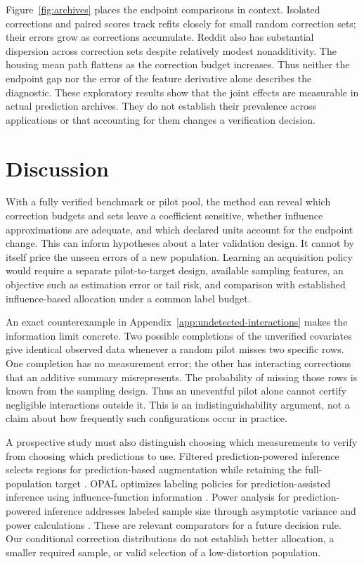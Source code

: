\documentclass[11pt]{article}
\begin{document}
Figure~\ref{fig:archives} places the endpoint comparisons in context. Isolated
corrections and paired scores track refits closely for small random correction
sets; their errors grow as corrections accumulate. Reddit also has substantial
dispersion across correction sets despite relatively modest nonadditivity.
The housing mean path flattens as the correction budget increases. Thus neither
the endpoint gap nor the error of the feature derivative alone describes the
diagnostic. These exploratory results show that the joint effects are measurable
in actual prediction archives. They do not establish their prevalence across
applications or that accounting for them changes a verification decision.

\section{Discussion}

With a fully verified benchmark or pilot pool, the method can reveal which
correction budgets and sets leave a coefficient sensitive, whether influence
approximations are adequate, and which declared units account for the endpoint
change. This can inform hypotheses about a later validation design. It cannot
by itself price the unseen errors of a new population. Learning an acquisition
policy would require a separate pilot-to-target design, available sampling
features, an objective such as estimation error or tail risk, and comparison
with established influence-based allocation under a common label budget.

An exact counterexample in Appendix~\ref{app:undetected-interactions} makes the
information limit concrete. Two possible completions of the unverified
covariates give identical observed data whenever a random pilot misses two
specific rows. One completion has no measurement error; the other has interacting
corrections that an additive summary misrepresents. The probability of missing
those rows is known from the sampling design. Thus an uneventful pilot alone
cannot certify negligible interactions outside it. This is an indistinguishability
argument, not a claim about how frequently such configurations occur in practice.

A prospective study must also distinguish choosing which measurements to
verify from choosing which predictions to use. Filtered prediction-powered
inference selects regions for prediction-based augmentation while retaining the
full-population target \citep{xu2026}. OPAL optimizes labeling policies for
prediction-assisted inference using influence-function information
\citep{ma2026}. Power analysis for prediction-powered inference addresses labeled
sample size through asymptotic variance and power calculations \citep{chen2026}.
These are relevant comparators for a future decision rule. Our conditional
correction distributions do not establish better allocation, a smaller required
sample, or valid selection of a low-distortion population.
\end{document}
